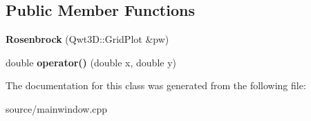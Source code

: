 \subsection*{Public Member Functions}
\begin{DoxyCompactItemize}
\item 
\hypertarget{classRosenbrock_aa8803fd4e38a835de1d7b71299e2b11b}{}{\bfseries Rosenbrock} (Qwt3\+D\+::\+Grid\+Plot \&pw)\label{classRosenbrock_aa8803fd4e38a835de1d7b71299e2b11b}

\item 
\hypertarget{classRosenbrock_ab583f473d97114aad858d383f4fbc9b1}{}double {\bfseries operator()} (double x, double y)\label{classRosenbrock_ab583f473d97114aad858d383f4fbc9b1}

\end{DoxyCompactItemize}


The documentation for this class was generated from the following file\+:\begin{DoxyCompactItemize}
\item 
source/mainwindow.\+cpp\end{DoxyCompactItemize}
